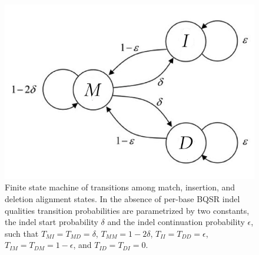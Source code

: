 \documentclass[nofootinbib,amssymb,amsmath]{revtex4}
\begin{document}
\begin{figure}
\center
\includegraphics[scale=0.35]{finite_state.png}
\caption{Finite state machine of transitions among match, insertion, and deletion alignment states.  In the absence of per-base BQSR indel qualities transition probabilities are parametrized  by two constants, the indel start probability $\delta$ and the indel continuation probability $\epsilon$, such that $T_{MI} = T_{MD} = \delta$, $T_{MM} = 1 - 2 \delta$, $T_{II} = T_{DD} = \epsilon$, $T_{IM} = T_{DM} = 1 - \epsilon$, and $T_{ID} = T_{DI} = 0$.}
\label{fig:fsm}
\end{figure}
\end{document}
